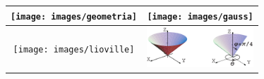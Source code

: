 \documentclass {article}
\begin{document}
	\begin{center}
		\begin{tabular}{|c|c|}\hline
			\texttt{[image: images/geometria]}
			&\texttt{[image: images/gauss]}\\\hline
			\texttt{[image: images/lioville]}
			&\includegraphics[width =4cm]{images/coodesfericas}\\\hline
		\end{tabular}
	\end{center}
\end{document}
